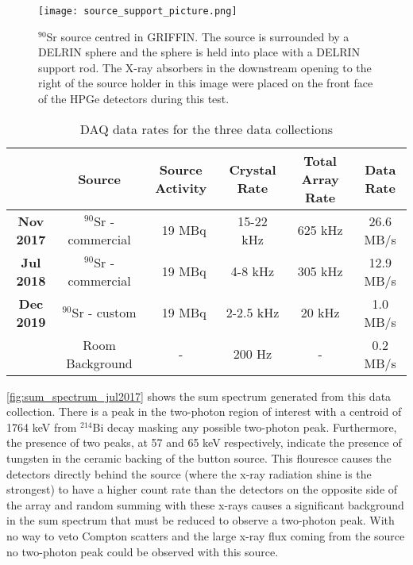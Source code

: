\documentclass[cnatzke_thesis_proposal.tex]{subfiles}
\begin{document}
\begin{figure}[htbp]
  \centering
  \texttt{[image: source\_support\_picture.png]}
  \caption{$^{90}$Sr source centred in GRIFFIN. The source is surrounded by a DELRIN sphere and the sphere is held into place with a DELRIN support rod. The X-ray absorbers in the downstream opening to the right of the source holder in this image were placed on the front face of the HPGe detectors during this test.}
  \label{fig:source_support_picture}
\end{figure}


\begin{table}[]
  \centering
  \begin{tabular}{cccccc}
                    & Source                  & Source Activity & Crystal Rate & Total Array Rate & Data Rate \\ \hline
  \textbf{Nov 2017} & $^{90}$Sr - commercial  & ~19 MBq         & 15-22 kHz    & 625 kHz          & 26.6 MB/s \\ \hline
  \textbf{Jul 2018} & $^{90}$Sr - commercial  & ~19 MBq         & 4-8 kHz      & 305 kHz          & 12.9 MB/s \\ \hline
  \textbf{Dec 2019} & $^{90}$Sr - custom      & ~19 MBq         & 2-2.5 kHz    & 20 kHz           & 1.0 MB/s  \\
                    & Room Background         & -               & 200 Hz       & -                & 0.2 MB/s  \\ \hline
  \end{tabular}
  \caption{DAQ data rates for the three data collections}
  \label{tab:daq_rates}
\end{table}

\ref{fig:sum_spectrum_jul2017} shows the sum spectrum generated from this data collection.
There is a peak in the two-photon region of interest with a centroid of 1764 keV from $^{214}$Bi decay masking any possible two-photon peak.
Furthermore, the presence of two peaks, at 57 and 65 keV respectively, indicate the presence of tungsten in the ceramic backing of the button source.
This flouresce causes the detectors directly behind the source (where the x-ray radiation shine is the strongest) to have a higher count rate than the detectors on the opposite side of the array and random summing with these x-rays causes a significant background in the sum spectrum that must be reduced to observe a two-photon peak. 
With no way to veto Compton scatters and the large x-ray flux coming from the source no two-photon peak could be observed with this source.
\end{document}
